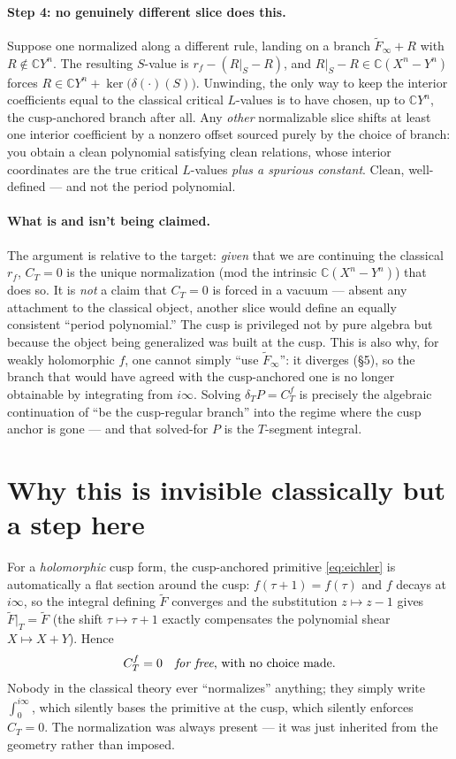 \documentclass[11pt]{article}
\newcommand{\CC}{\mathbb{C}}
\newcommand{\Eich}{\widetilde{F}}
\begin{document}
\paragraph{Step 4: no genuinely different slice does this.} Suppose one
normalized along a different rule, landing on a branch $\Eich_\infty + R$
with $R \notin \CC Y^n$. The resulting $S$-value is
$r_f - (R|_S - R)$, and $R|_S - R \in \CC(X^n-Y^n)$ forces $R \in \CC Y^n
+ \ker\!\big(\delta(\cdot)(S)\big)$. Unwinding, the only way to keep the
interior coefficients equal to the classical critical $L$-values is to
have chosen, up to $\CC Y^n$, the cusp-anchored branch after all. Any
\emph{other} normalizable slice shifts at least one interior coefficient
by a nonzero offset sourced purely by the choice of branch: you obtain a
clean polynomial satisfying clean relations, whose interior coordinates
are the true critical $L$-values \emph{plus a spurious constant}. Clean,
well-defined --- and not the period polynomial.

\paragraph{What is and isn't being claimed.} The argument is relative to
the target: \emph{given} that we are continuing the classical $r_f$,
$C_T = 0$ is the unique normalization (mod the intrinsic
$\CC(X^n - Y^n)$) that does so. It is \emph{not} a claim that $C_T = 0$ is
forced in a vacuum --- absent any attachment to the classical object,
another slice would define an equally consistent ``period polynomial.''
The cusp is privileged not by pure algebra but because the object being
generalized was built at the cusp. This is also why, for weakly
holomorphic $f$, one cannot simply ``use $\Eich_\infty$'': it diverges
(\S5), so the branch that would have agreed with the cusp-anchored one is
no longer obtainable by integrating from $i\infty$. Solving
$\delta_T P = C^f_T$ is precisely the algebraic continuation of ``be the
cusp-regular branch'' into the regime where the cusp anchor is gone --- and
that solved-for $P$ is the $T$-segment integral.

\section{Why this is invisible classically but a step here}

For a \emph{holomorphic} cusp form, the cusp-anchored primitive
\eqref{eq:eichler} is automatically a flat section around the cusp:
$f(\tau+1) = f(\tau)$ and $f$ decays at $i\infty$, so the integral defining
$\Eich$ converges and the substitution $z \mapsto z-1$ gives
$\Eich|_T = \Eich$ (the shift $\tau \mapsto \tau+1$ exactly compensates the
polynomial shear $X \mapsto X+Y$). Hence
\[
  C^f_T = 0 \quad\text{\emph{for free}, with no choice made.}
\]
Nobody in the classical theory ever ``normalizes'' anything; they simply
write $\int_0^{i\infty}$, which silently bases the primitive at the cusp,
which silently enforces $C_T = 0$. The normalization was always present
--- it was just inherited from the geometry rather than imposed.
\end{document}
